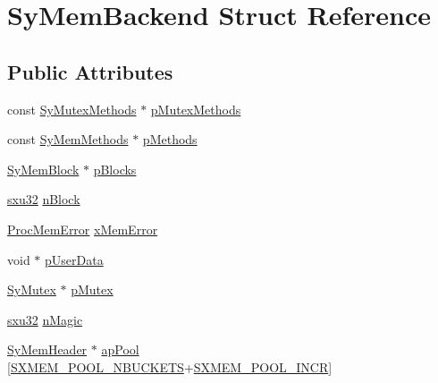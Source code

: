 \hypertarget{struct_sy_mem_backend}{\section{Sy\-Mem\-Backend Struct Reference}
\label{d0/dc7/struct_sy_mem_backend}
}
\subsection*{Public Attributes}
\begin{DoxyCompactItemize}
\item 
const \hyperlink{struct_sy_mutex_methods}{Sy\-Mutex\-Methods} $\ast$ \hyperlink{struct_sy_mem_backend_a70af172f4ec527d7a28c5b6b434875b6}{p\-Mutex\-Methods}
\item 
const \hyperlink{struct_sy_mem_methods}{Sy\-Mem\-Methods} $\ast$ \hyperlink{struct_sy_mem_backend_a4db10b2661b2584547103d596da8d2f3}{p\-Methods}
\item 
\hyperlink{struct_sy_mem_block}{Sy\-Mem\-Block} $\ast$ \hyperlink{struct_sy_mem_backend_a2ba2058b8d89b88dce66c81a5e18c386}{p\-Blocks}
\item 
\hyperlink{unqlite_8c_abc5a8a3f345c200c98c485551f49666e}{sxu32} \hyperlink{struct_sy_mem_backend_a378cd197f9a80d521edc1858eeea59d2}{n\-Block}
\item 
\hyperlink{unqlite_8h_added5118c2d09707e110965c93b82ee1}{Proc\-Mem\-Error} \hyperlink{struct_sy_mem_backend_a7c71631377efe316cf49e40176166aba}{x\-Mem\-Error}
\item 
void $\ast$ \hyperlink{struct_sy_mem_backend_a472e3fc25df43d13f8d225e2baa88be5}{p\-User\-Data}
\item 
\hyperlink{unqlite_8c_a1f52a7d2389ac9799eeca9ba107dcf0f}{Sy\-Mutex} $\ast$ \hyperlink{struct_sy_mem_backend_a6d143e0f60592c36ee983b6da929c59f}{p\-Mutex}
\item 
\hyperlink{unqlite_8c_abc5a8a3f345c200c98c485551f49666e}{sxu32} \hyperlink{struct_sy_mem_backend_a56806bb37f790b073a00ff10c9684d1d}{n\-Magic}
\item 
\hyperlink{union_sy_mem_header}{Sy\-Mem\-Header} $\ast$ \hyperlink{struct_sy_mem_backend_a669f5ba6ba076b587c7e733bf96f1636}{ap\-Pool} \mbox{[}\hyperlink{unqlite_8c_a2119fa6c28d6fae627f7bcf498d35767}{S\-X\-M\-E\-M\-\_\-\-P\-O\-O\-L\-\_\-\-N\-B\-U\-C\-K\-E\-T\-S}+\hyperlink{unqlite_8c_a9a4bd871d9ef28c63137e0496aaafdc9}{S\-X\-M\-E\-M\-\_\-\-P\-O\-O\-L\-\_\-\-I\-N\-C\-R}\mbox{]}
\end{DoxyCompactItemize}


